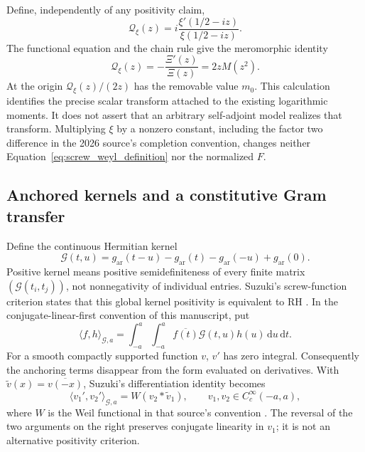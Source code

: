 \documentclass[11pt,letterpaper]{article}
\numberwithin{equation}{section}
\theoremstyle{definition}
\theoremstyle{remark}
\newcommand{\dd}{\,\mathrm d}
\begin{document}
Define, independently of any positivity claim,
\begin{equation}
 \mathcal Q_\xi(z)=i\frac{\xi'(1/2-iz)}{\xi(1/2-iz)}.
 \label{eq:screw_weyl_definition}
\end{equation}
The functional equation and the chain rule give the meromorphic identity
\begin{equation}
 \boxed{\mathcal Q_\xi(z)=-\frac{\Xi'(z)}{\Xi(z)}=2zM(z^2).}
 \label{eq:screw_weyl_moment}
\end{equation}
At the origin $\mathcal Q_\xi(z)/(2z)$ has the removable value $m_0$. This calculation identifies the precise scalar transform attached to the existing logarithmic moments. It does not assert that an arbitrary self-adjoint model realizes that transform. Multiplying $\xi$ by a nonzero constant, including the factor two difference in the 2026 source's completion convention, changes neither Equation~\eqref{eq:screw_weyl_definition} nor the normalized $F$.

\subsection{Anchored kernels and a constitutive Gram transfer}
\label{subsec:screwgram}
Define the continuous Hermitian kernel
\begin{equation}
 \mathscr G(t,u)=g_{\mathrm{ar}}(t-u)-g_{\mathrm{ar}}(t)
                -g_{\mathrm{ar}}(-u)+g_{\mathrm{ar}}(0).
 \label{eq:screw_kernel}
\end{equation}
Positive kernel means positive semidefiniteness of every finite matrix $(\mathscr G(t_i,t_j))$, not nonnegativity of individual entries. Suzuki's screw-function criterion states that this global kernel positivity is equivalent to RH \cite[Theorem~1.2]{suzuki2023}. In the conjugate-linear-first convention of this manuscript, put
\[
 \langle f,h\rangle_{\mathscr G,a}
 =\int_{-a}^a\int_{-a}^a\overline{f(t)}\mathscr G(t,u)h(u)\dd u\dd t.
\]
For a smooth compactly supported function $v$, $v'$ has zero integral. Consequently the anchoring terms disappear from the form evaluated on derivatives. With $\widetilde v(x)=\overline{v(-x)}$, Suzuki's differentiation identity becomes
\begin{equation}
 \langle v_1',v_2'\rangle_{\mathscr G,a}
 =W(v_2*\widetilde v_1),\qquad v_1,v_2\in C_c^\infty(-a,a),
 \label{eq:screw_weil_derivatives}
\end{equation}
where $W$ is the Weil functional in that source's convention \cite[Proposition~3.1]{suzuki2023}. The reversal of the two arguments on the right preserves conjugate linearity in $v_1$; it is not an alternative positivity criterion.
\end{document}
